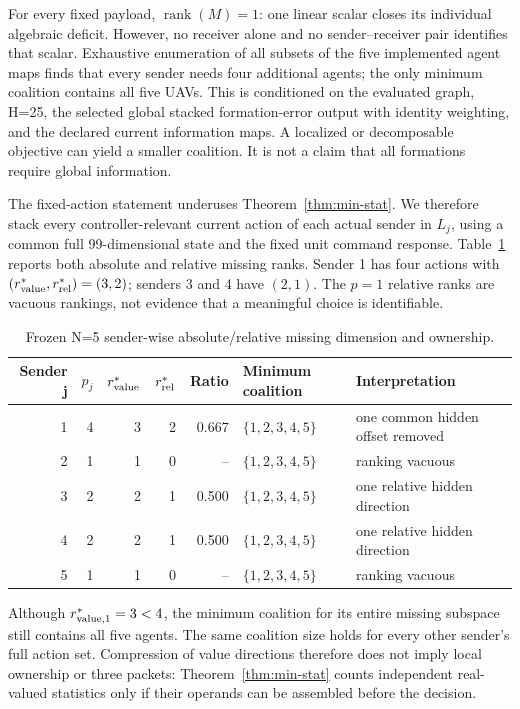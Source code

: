 \documentclass[10pt,twocolumn,twoside]{IEEEtran}
\DeclareMathOperator{\rank}{rank}
\begin{document}
For every fixed payload, \(\rank(M)=1\): one linear scalar closes its
individual algebraic deficit.  However, no receiver alone and no
sender--receiver pair identifies that scalar.  Exhaustive enumeration of all
subsets of the five implemented agent maps finds that every sender needs four
additional agents; the only minimum coalition contains all five UAVs.  This
is conditioned on the evaluated graph, H=25, the selected global stacked
formation-error output with identity weighting, and the declared current
information maps.  A localized or decomposable objective can yield a smaller
coalition.  It is not a claim that all formations require global information.

The fixed-action statement underuses Theorem~\ref{thm:min-stat}.  We therefore
stack every controller-relevant current action of each actual sender in
\(L_j\), using a common full 99-dimensional state and the fixed unit command
response.  Table~\ref{tab:multi-action} reports both absolute and relative
missing ranks.  Sender 1 has four actions with
\((r_{\rm value}^*,r_{\rm rel}^*)=(3,2)\); senders 3 and 4 have \((2,1)\).
The \(p=1\) relative ranks are vacuous rankings, not evidence that a meaningful
choice is identifiable.

\begin{table}[t]
\caption{Frozen N=5 sender-wise absolute/relative missing dimension and ownership.}
\label{tab:multi-action}
\centering
\scriptsize
\begin{tabular}{rrrrrlp{5.0cm}}
\toprule
Sender j & $p_j$ & $r_{\rm value}^*$ & $r_{\rm rel}^*$ & Ratio & Minimum coalition & Interpretation \\
\midrule
1 & 4 & 3 & 2 & 0.667 & $\{1,2,3,4,5\}$ & one common hidden offset removed \\
2 & 1 & 1 & 0 & -- & $\{1,2,3,4,5\}$ & ranking vacuous \\
3 & 2 & 2 & 1 & 0.500 & $\{1,2,3,4,5\}$ & one relative hidden direction \\
4 & 2 & 2 & 1 & 0.500 & $\{1,2,3,4,5\}$ & one relative hidden direction \\
5 & 1 & 1 & 0 & -- & $\{1,2,3,4,5\}$ & ranking vacuous \\
\bottomrule
\end{tabular}
\end{table}

Although \(r_{\rm value,1}^*=3<4\), the minimum coalition for its entire missing subspace
still contains all five agents.  The same coalition size holds for every
other sender's full action set.  Compression of value directions therefore
does not imply local ownership or three packets: Theorem~\ref{thm:min-stat}
counts independent real-valued statistics only if their operands can be
assembled before the decision.
\end{document}
